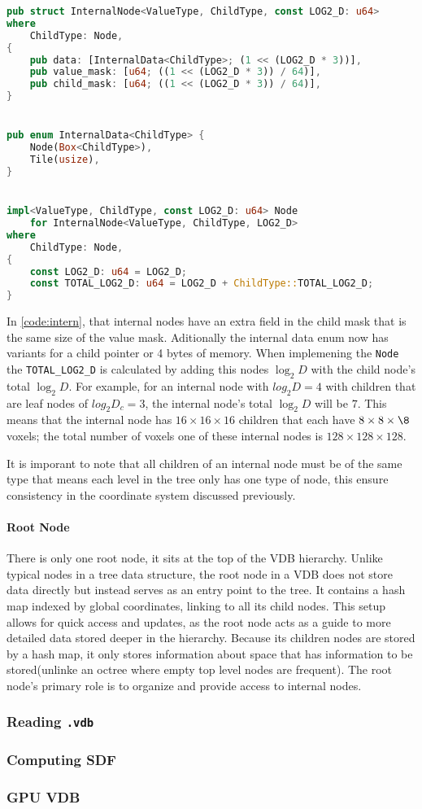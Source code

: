 \begin{lstlisting}[language=rust, captionpos=b, caption={\texttt{InternalNode} definition},label={code:intern}]
pub struct InternalNode<ValueType, ChildType, const LOG2_D: u64>
where
    ChildType: Node,
{
    pub data: [InternalData<ChildType>; (1 << (LOG2_D * 3))],
    pub value_mask: [u64; ((1 << (LOG2_D * 3)) / 64)],
    pub child_mask: [u64; ((1 << (LOG2_D * 3)) / 64)],
}


pub enum InternalData<ChildType> {
    Node(Box<ChildType>),
    Tile(usize),
}


impl<ValueType, ChildType, const LOG2_D: u64> Node
    for InternalNode<ValueType, ChildType, LOG2_D>
where
    ChildType: Node,
{
    const LOG2_D: u64 = LOG2_D;
    const TOTAL_LOG2_D: u64 = LOG2_D + ChildType::TOTAL_LOG2_D;
}
\end{lstlisting}

In \cref{code:intern}, that internal nodes have an extra field in the child mask that is the same size of the value mask. Aditionally the internal data enum now has variants for a child pointer or 4 bytes of memory. When implemening the \verb|Node| the \verb|TOTAL_LOG2_D| is calculated by adding this nodes $\log_{2}D$ with the child node's total $\log_{2}D$. For example, for an internal node with $log_{2}D = 4$ with children that are leaf nodes of $log_{2}D_{c} = 3$, the internal node's total $\log_{2}D$ will be $7$. This means that the internal node has $16\times16\times16$  children that each have $8\times8\times\8$ voxels; the total number of voxels one of these internal nodes is $128\times128\times128$.

It is imporant to note that all children of an internal node must be of the same type that means each level in the tree only has one type of node, this ensure consistency in the coordinate system discussed previously.

\paragraph{Root Node} There is only one root node, it sits at the top of the VDB hierarchy. Unlike typical nodes in a tree data structure, the root node in a VDB does not store data directly but instead serves as an entry point to the tree.
It contains a hash map indexed by global coordinates, linking to all its child nodes. This setup allows for quick access and updates, as the root node acts as a guide to more detailed data stored deeper in the hierarchy. Because its children nodes are stored by a hash map, it only stores information about space that has information to be stored(unlinke an octree where empty top level nodes are frequent). The root node's primary role is to organize and provide access to internal nodes.

\subsubsection{Reading \texttt{.vdb}}
\subsubsection{Computing SDF}
\subsubsection{GPU VDB}
